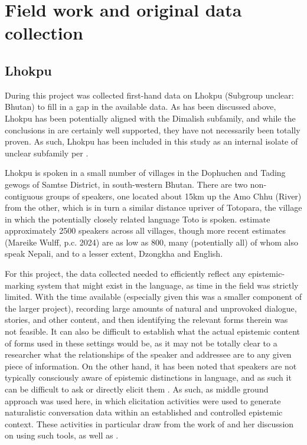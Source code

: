 \appendix
\chapter{Field work and original data collection}\label{s:Methods:FieldMethods}
\section{Lhokpu}
During this project was collected first-hand data on Lhokpu (Subgroup unclear: Bhutan) to fill in a gap in the available data. As has been discussed above, Lhokpu has been potentially aligned with the Dimalish subfamily, and while the conclusions in  are certainly well supported, they have not necessarily been totally proven. As such, Lhokpu has been included in this study as an internal isolate of unclear subfamily per .

Lhokpu is spoken in a small number of villages in the Dophuchen and Tading gewogs of Samtse District, in  south-western Bhutan. There are two non-contiguous groups of speakers, one located about 15km up the Amo Chhu (River) from the other, which is in turn a similar distance upriver of Totopara, the village in which the potentially closely related language Toto is spoken.  estimate approximately 2500 speakers across all villages, though more recent estimates (Mareike Wulff, p.c. 2024) are as low as 800, many (potentially all) of whom also speak Nepali, and to a lesser extent, Dzongkha and English.

For this project, the data collected needed to efficiently reflect any epistemic-marking system that might exist in the language, as time in the field was strictly limited. With the time available (especially given this was a smaller component of the larger project), recording large amounts of natural and unprovoked dialogue, stories, and other content, and then identifying the relevant forms therein was not feasible. It can also be difficult to establish what the actual epistemic content of forms used in these settings would be, as it may not be totally clear to a researcher what the relationships of the speaker and addressee are to any given piece of information. On the other hand, it has been noted that speakers are not typically consciously aware of epistemic distinctions in language, and as such it can be difficult to ask or directly elicit them \cites{Gawne2013}{Grzech2020}. As such, as middle ground approach was used here, in which elicitation activities were used to generate naturalistic conversation data within an established and controlled epistemic context. These activities in particular draw from the work of  and her discussion on using such tools, as well as .


